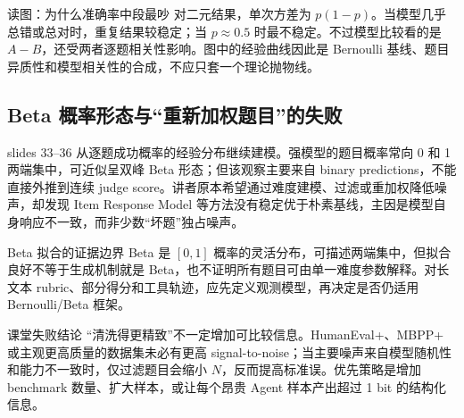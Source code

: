 
\begin{knowledgebox}{读图：为什么准确率中段最吵}
对二元结果，单次方差为 $p(1-p)$。当模型几乎总错或总对时，重复结果较稳定；当 $p\approx0.5$ 时最不稳定。不过模型比较看的是 $A-B$，还受两者逐题相关性影响。图中的经验曲线因此是 Bernoulli 基线、题目异质性和模型相关性的合成，不应只套一个理论抛物线。
\end{knowledgebox}

\subsection{Beta 概率形态与“重新加权题目”的失败}

slides 33--36 从逐题成功概率的经验分布继续建模。强模型的题目概率常向 0 和 1 两端集中，可近似呈双峰 Beta 形态；但该观察主要来自 binary predictions，不能直接外推到连续 judge score。讲者原本希望通过难度建模、过滤或重加权降低噪声，却发现 Item Response Model 等方法没有稳定优于朴素基线，主因是模型自身响应不一致，而非少数“坏题”独占噪声。


\begin{warningbox}{Beta 拟合的证据边界}
Beta 是 $[0,1]$ 概率的灵活分布，可描述两端集中，但拟合良好不等于生成机制就是 Beta，也不证明所有题目可由单一难度参数解释。对长文本 rubric、部分得分和工具轨迹，应先定义观测模型，再决定是否仍适用 Bernoulli/Beta 框架。
\end{warningbox}

\begin{importantbox}{课堂失败结论}
“清洗得更精致”不一定增加可比较信息。HumanEval+、MBPP+ 或主观更高质量的数据集未必有更高 signal-to-noise；当主要噪声来自模型随机性和能力不一致时，仅过滤题目会缩小 $N$，反而提高标准误。优先策略是增加 benchmark 数量、扩大样本，或让每个昂贵 Agent 样本产出超过 1 bit 的结构化信息。
\end{importantbox}

